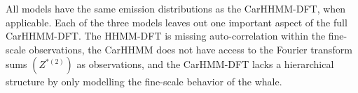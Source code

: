 All models have the same emission distributions as the CarHHMM-DFT, when applicable. Each of the three models leaves out one important aspect of the full CarHHMM-DFT. The HHMM-DFT is missing auto-correlation within the fine-scale observations, the CarHHMM does not have access to the Fourier transform sums $(Z^{*(2)})$ as observations, and the CarHMM-DFT lacks a hierarchical structure by only modelling the fine-scale behavior of the whale.